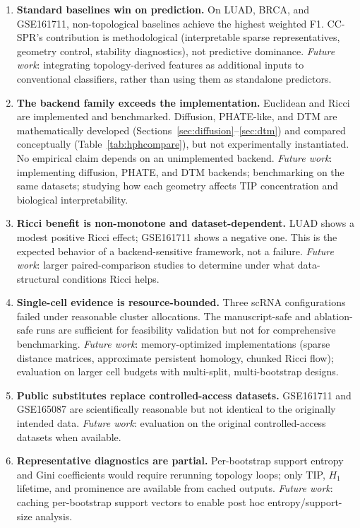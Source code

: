 \documentclass[11pt]{article}
\begin{document}
\begin{enumerate}[leftmargin=1.5em]
\item \textbf{Standard baselines win on prediction.}
On LUAD, BRCA, and GSE161711, non-topological baselines achieve the highest weighted F1.
CC-SPR's contribution is methodological (interpretable sparse representatives, geometry control, stability diagnostics), not predictive dominance.
\emph{Future work}: integrating topology-derived features as additional inputs to conventional classifiers, rather than using them as standalone predictors.

\item \textbf{The backend family exceeds the implementation.}
Euclidean and Ricci are implemented and benchmarked.
Diffusion, PHATE-like, and DTM are mathematically developed (Sections~\ref{sec:diffusion}--\ref{sec:dtm}) and compared conceptually (Table~\ref{tab:hphcompare}), but not experimentally instantiated.
No empirical claim depends on an unimplemented backend.
\emph{Future work}: implementing diffusion, PHATE, and DTM backends; benchmarking on the same datasets; studying how each geometry affects TIP concentration and biological interpretability.

\item \textbf{Ricci benefit is non-monotone and dataset-dependent.}
LUAD shows a modest positive Ricci effect; GSE161711 shows a negative one.
This is the expected behavior of a backend-sensitive framework, not a failure.
\emph{Future work}: larger paired-comparison studies to determine under what data-structural conditions Ricci helps.

\item \textbf{Single-cell evidence is resource-bounded.}
Three scRNA configurations failed under reasonable cluster allocations.
The manuscript-safe and ablation-safe runs are sufficient for feasibility validation but not for comprehensive benchmarking.
\emph{Future work}: memory-optimized implementations (sparse distance matrices, approximate persistent homology, chunked Ricci flow); evaluation on larger cell budgets with multi-split, multi-bootstrap designs.

\item \textbf{Public substitutes replace controlled-access datasets.}
GSE161711 and GSE165087 are scientifically reasonable but not identical to the originally intended data.
\emph{Future work}: evaluation on the original controlled-access datasets when available.

\item \textbf{Representative diagnostics are partial.}
Per-bootstrap support entropy and Gini coefficients would require rerunning topology loops; only TIP, $H_1$ lifetime, and prominence are available from cached outputs.
\emph{Future work}: caching per-bootstrap support vectors to enable post hoc entropy/support-size analysis.
\end{enumerate}
\end{document}
